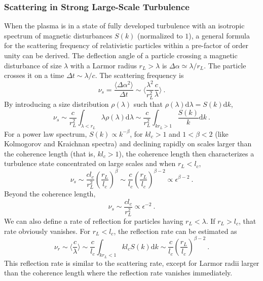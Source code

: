 \documentclass[12pt,a4paper]{article}
\newcommand{\dif}{\mathrm{d}}
\begin{document}
\subsubsection{Scattering in Strong Large-Scale Turbulence}
When the plasma is in a state of fully developed turbulence with an isotropic spectrum of magnetic disturbances $S(k)$ (normalized to $1$), a general formula for the scattering frequency of relativistic particles within a pre-factor of order unity can be derived. The deflection angle of a particle crossing a magnetic disturbance of size $\lambda$ with a Larmor radius $r_L > \lambda$ is $\Delta \alpha \simeq \lambda/r_L$. The particle crosses it on a time $\Delta t \sim \lambda/c$. The scattering frequency is
\begin{equation}
\nu_s = \frac{\langle \Delta \alpha^2 \rangle}{\Delta t}  \sim \langle \frac{\lambda^2}{r^2_L} \frac{c}{\lambda} \rangle ~.
\end{equation}
By introducing a size distribution $\rho(\lambda)$ such that $\rho(\lambda)\dif \lambda = S(k)\dif k$,
\begin{equation}
\nu_s \sim \frac{c}{r_L^2} \int_{\lambda < r_L} \lambda \rho(\lambda) \dif \lambda \sim \frac{c}{r_L^2} \int_{kr_L > 1} \frac{S(k)}{k} \dif k ~.
\end{equation}
For a power law spectrum, $S(k) \propto k^{-\beta}$, for $k l_c > 1$ and $1< \beta < 2$ (like Kolmogorov and Kraichnan spectra) and declining rapidly on scales larger than the coherence length (that is, $k l_c > 1$), the coherence length then characterizes a turbulence state concentrated on large scales and when $r_L < l_c$, 
\begin{equation}
\nu_s \sim \frac{c l_c}{r^2_L} \left( \frac{r_L}{l_c} \right)^\beta \sim \frac{c }{l_c} \left( \frac{r_L}{l_c} \right)^{\beta-2} \propto \epsilon^{\beta-2} ~.
\end{equation}
Beyond the coherence length,
\begin{equation}
\nu_s \sim \frac{c l_c}{r^2_L} \propto \epsilon^{-2}  ~.
\end{equation}
We can also define a rate of reflection for particles having $r_L <  \lambda$. If $r_L > l_c$, that rate obviously vanishes. For $r_L < l_c$, the reflection rate can be estimated as
\begin{equation}
\nu_r \sim \langle \frac{c}{\lambda} \rangle \sim \frac{c}{l_c} \int_{kr_L < 1} k l_c S(k) \dif k \sim \frac{c}{l_c} \left( \frac{r_L}{l_c} \right)^{\beta-2} ~.
\end{equation}
This reflection rate is similar to the scattering rate, except for Larmor radii larger than the coherence length where the reflection rate vanishes immediately.
\end{document}
